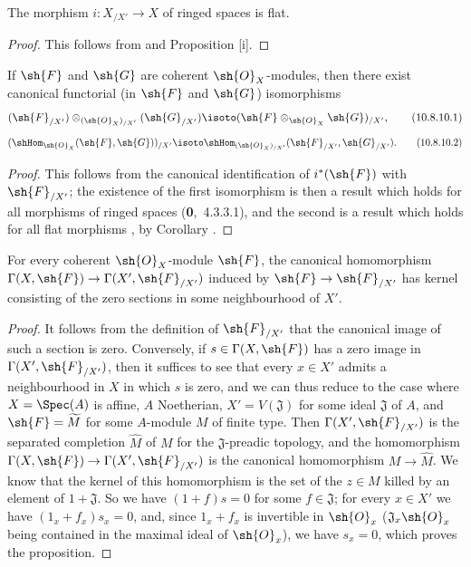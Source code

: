\begin{corollary}[10.8.9]
\label{I.10.8.9}
The morphism $i:X_{/X'}\to X$ of ringed spaces is flat.
\end{corollary}

\begin{proof}
This follows from  and Proposition [i].
\end{proof}

\begin{corollary}[10.8.10]
\label{I.10.8.10}
If $\sh{F}$ and $\sh{G}$ are coherent $\sh{O}_X$-modules, then there exist canonical functorial (in $\sh{F}$ and $\sh{G}$) isomorphisms
\[
\label{I.10.8.10.1}
  (\sh{F}_{/X'})\otimes_{(\sh{O}_X)_{/X'}}(\sh{G}_{/X'})\isoto(\sh{F}\otimes_{\sh{O}_X}\sh{G})_{/X'},
  \tag{10.8.10.1}
\]
\[
\label{I.10.8.10.2}
  (\shHom_{\sh{O}_X}(\sh{F},\sh{G}))_{/X'}\isoto\shHom_{(\sh{O}_X)_{/X'}}(\sh{F}_{/X'},\sh{G}_{/X'}).
  \tag{10.8.10.2}
\]
\end{corollary}

\begin{proof}
This follows from the canonical identification of $i^*(\sh{F})$ with $\sh{F}_{/X'}$; the existence of the first isomorphism is then a result which holds for all morphisms of ringed spaces (\textbf{0},~4.3.3.1), and the second is a result which holds for all flat morphisms , by Corollary .
\end{proof}

\begin{proposition}[10.8.11]
\label{I.10.8.11}
For every coherent $\sh{O}_X$-module $\sh{F}$, the canonical homomorphism $\Gamma(X,\sh{F})\to\Gamma(X',\sh{F}_{/X'})$ induced by $\sh{F}\to\sh{F}_{/X'}$ has kernel consisting of the zero sections in some neighbourhood of $X'$.
\end{proposition}

\begin{proof}
It follows from the definition of $\sh{F}_{/X'}$ that the canonical image of such a section is zero.
Conversely, if $s\in\Gamma(X,\sh{F})$ has a zero image in $\Gamma(X',\sh{F}_{/X'})$, then it suffices to see that every $x\in X'$ admits a neighbourhood in $X$ in which $s$ is zero, and we can thus reduce to the case where $X=\Spec(A)$ is affine, $A$ Noetherian, $X'=V(\mathfrak{J})$ for some ideal $\mathfrak{J}$ of $A$, and $\sh{F}=\widetilde{M}$ for some $A$-module $M$ of finite type.
Then $\Gamma(X',\sh{F}_{/X'})$ is the separated completion $\widehat{M}$ of $M$ for the $\mathfrak{J}$-preadic topology, and the homomorphism $\Gamma(X,\sh{F})\to\Gamma(X',\sh{F}_{/X'})$ is the canonical homomorphism $M\to\widehat{M}$.
We know  that the kernel of this homomorphism is the set of the $z\in M$ killed by an element of $1+\mathfrak{J}$.
So we have $(1+f)s=0$ for some $f\in\mathfrak{J}$; for every $x\in X'$ we have $(1_x+f_x)s_x=0$, and, since $1_x+f_x$ is invertible in $\sh{O}_x$ ($\mathfrak{J}_x\sh{O}_x$ being contained in the maximal ideal of $\sh{O}_x$), we have $s_x=0$, which proves the proposition.
\end{proof}

